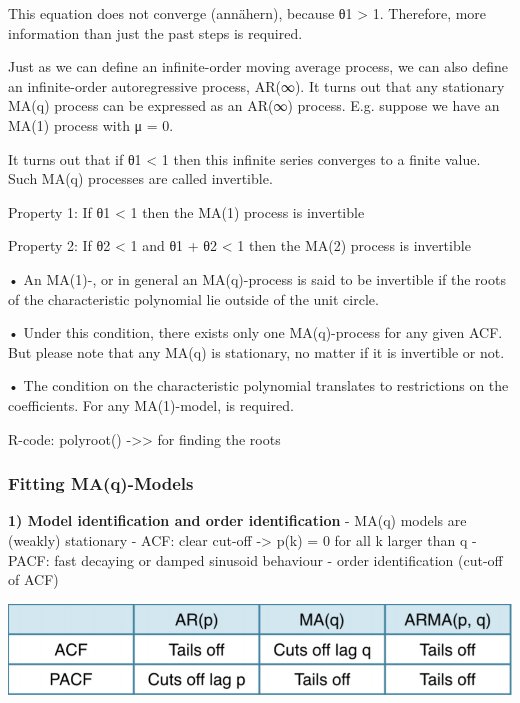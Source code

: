 \documentclass[
]{article}
\begin{document}
This equation does not converge (annähern), because
\textbar θ1\textbar{} \textgreater{} 1. Therefore, more information than
just the past steps is required.

Just as we can define an infinite-order moving average process, we can
also define an infinite-order autoregressive process, AR(∞). It turns
out that any stationary MA(q) process can be expressed as an AR(∞)
process. E.g. suppose we have an MA(1) process with μ = 0.

It turns out that if \textbar θ1\textbar{} \textless{} 1 then this
infinite series converges to a finite value. Such MA(q) processes are
called invertible.

Property 1: If \textbar θ1\textbar{} \textless{} 1 then the MA(1)
process is invertible

Property 2: If \textbar θ2\textbar{} \textless{} 1 and
\textbar θ1\textbar{} + θ2 \textless{} 1 then the MA(2) process is
invertible

• An MA(1)-, or in general an MA(q)-process is said to be invertible if
the roots of the characteristic polynomial lie outside of the unit
circle.

• Under this condition, there exists only one MA(q)-process for any
given ACF. But please note that any MA(q) is stationary, no matter if it
is invertible or not.

• The condition on the characteristic polynomial translates to
restrictions on the coefficients. For any MA(1)-model, is required.

R-code: polyroot() -\textgreater\textgreater{} for finding the roots

\hypertarget{fitting-maq-models}{%
\subsubsection{Fitting MA(q)-Models}\label{fitting-maq-models}}

\textbf{1) Model identification and order identification} - MA(q) models
are (weakly) stationary - ACF: clear cut-off -\textgreater{} p(k) = 0
for all k larger than q - PACF: fast decaying or damped sinusoid
behaviour - order identification (cut-off of ACF)

\includegraphics[width=1\linewidth]{ident}
\end{document}
